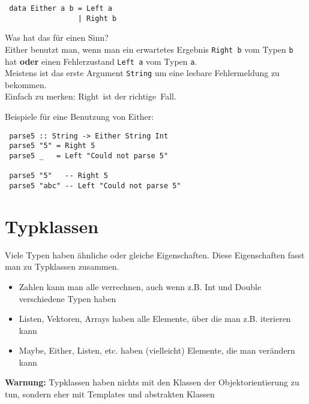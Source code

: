 \documentclass{beamer}
\begin{document}
\begin{frame}[fragile]
 \begin{verbatim}
 data Either a b = Left a
                 | Right b
 \end{verbatim}
 \pause
 Was hat das für einen Sinn?\\
 \pause
 Either benutzt man, wenn man ein erwartetes Ergebnis \texttt{Right b} vom Typen \texttt{b} hat \textbf{oder} einen Fehlerzustand \texttt{Left a} vom Typen \texttt{a}.\\
 Meistens ist das erste Argument \texttt{String} um eine lesbare Fehlermeldung zu bekommen.\\
 \pause
 \bigskip
 Einfach zu merken: \glqq Right\grqq \ ist der \glqq richtige\grqq \ Fall.
\end{frame}

\begin{frame}[fragile]
 Beispiele für eine Benutzung von Either:
 \begin{verbatim}
 parse5 :: String -> Either String Int
 parse5 "5" = Right 5
 parse5 _   = Left "Could not parse 5"
 
 parse5 "5"   -- Right 5
 parse5 "abc" -- Left "Could not parse 5"
 \end{verbatim}
\end{frame}


\section{Typklassen}
\begin{frame}
Viele Typen haben ähnliche oder gleiche Eigenschaften. Diese Eigenschaften fasst man zu Typklassen zusammen.\\
\pause
\begin{itemize}
 \item Zahlen kann man alle verrechnen, auch wenn z.B. Int und Double verschiedene Typen haben
 \item Listen, Vektoren, Arrays haben alle Elemente, über die man z.B. iterieren kann
 \item Maybe, Either, Listen, etc. haben (vielleicht) Elemente, die man verändern kann
\end{itemize}
\pause
\begin{important}
\textbf{Warnung:} Typklassen haben nichts mit den Klassen der Objektorientierung zu tun, sondern eher mit Templates und abstrakten Klassen
\end{important}
\end{frame}
\end{document}
